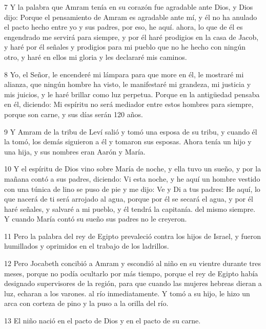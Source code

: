 \par 7 Y la palabra que Amram tenía en su corazón fue agradable ante Dios, y Dios dijo: Porque el pensamiento de Amram es agradable ante mí, y él no ha anulado el pacto hecho entre yo y sus padres, por eso, he aquí. ahora, lo que de él es engendrado me servirá para siempre, y por él haré prodigios en la casa de Jacob, y haré por él señales y prodigios para mi pueblo que no he hecho con ningún otro, y haré en ellos mi gloria y les declararé mis caminos.

\par 8 Yo, el Señor, le encenderé mi lámpara para que more en él, le mostraré mi alianza, que ningún hombre ha visto, le manifestaré mi grandeza, mi justicia y mis juicios, y le haré brillar como luz perpetua. Porque en la antigüedad pensaba en él, diciendo: Mi espíritu no será mediador entre estos hombres para siempre, porque son carne, y sus días serán 120 años.

\par 9 Y Amram de la tribu de Leví salió y tomó una esposa de su tribu, y cuando él la tomó, los demás siguieron a él y tomaron sus esposas. Ahora tenía un hijo y una hija, y sus nombres eran Aarón y María.

\par 10 Y el espíritu de Dios vino sobre María de noche, y ella tuvo un sueño, y por la mañana contó a sus padres, diciendo: Vi esta noche, y he aquí un hombre vestido con una túnica de lino se puso de pie y me dijo: Ve y Di a tus padres: He aquí, lo que nacerá de ti será arrojado al agua, porque por él se secará el agua, y por él haré señales, y salvaré a mi pueblo, y él tendrá la capitanía. del mismo siempre. Y cuando María contó su sueño sus padres no le creyeron.

\par 11 Pero la palabra del rey de Egipto prevaleció contra los hijos de Israel, y fueron humillados y oprimidos en el trabajo de los ladrillos.

\par 12 Pero Jocabeth concibió a Amram y escondió al niño en su vientre durante tres meses, porque no podía ocultarlo por más tiempo, porque el rey de Egipto había designado supervisores de la región, para que cuando las mujeres hebreas dieran a luz, echaran a los varones. al río inmediatamente. Y tomó a su hijo, le hizo un arca con corteza de pino y la puso a la orilla del río.

\par 13 El niño nació en el pacto de Dios y en el pacto de su carne.

